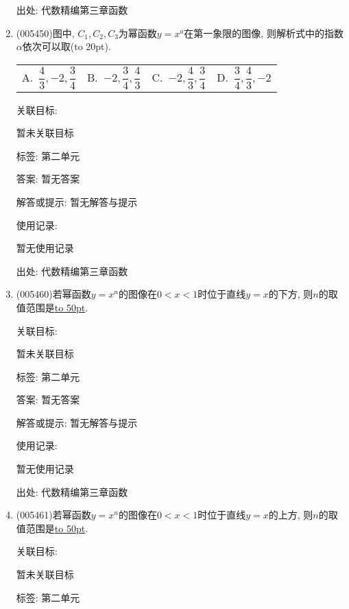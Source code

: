 \documentclass[10pt,a4paper]{article}
\newcommand{\blank}[1]{\underline{\hbox to #1pt{}}}
\newcommand{\bracket}[1]{(\hbox to #1pt{})}
\newcommand{\fourch}[4]{\par\begin{tabular}{p{.23\textwidth}p{.23\textwidth}p{.23\textwidth}p{.23\textwidth}}
A.~#1 &B.~#2& C.~#3& D.~#4
\end{tabular}}
\begin{document}
\begin{enumerate}[1.]
出处: 代数精编第三章函数
\item { (005450)}图中, $C_1,C_2,C_3$为幂函数$y=x^a$在第一象限的图像, 则解析式中的指数$\alpha$依次可以取\bracket{20}.
\begin{center}
\end{center}
\fourch{$\dfrac 43,-2,\dfrac 34$}{$-2,\dfrac 34,\dfrac 43$}{$-2,\dfrac 43,\dfrac 34$}{$\dfrac 34,\dfrac 43,-2$}


关联目标:

暂未关联目标



标签: 第二单元

答案: 暂无答案

解答或提示: 暂无解答与提示

使用记录:

暂无使用记录


出处: 代数精编第三章函数
\item { (005460)}若幂函数$y=x^n$的图像在$0<x<1$时位于直线$y=x$的下方, 则$n$的取值范围是\blank{50}.


关联目标:

暂未关联目标



标签: 第二单元

答案: 暂无答案

解答或提示: 暂无解答与提示

使用记录:

暂无使用记录


出处: 代数精编第三章函数
\item { (005461)}若幂函数$y=x^n$的图像在$0<x<1$时位于直线$y=x$的上方, 则$n$的取值范围是\blank{50}.


关联目标:

暂未关联目标



标签: 第二单元


\end{enumerate}
\end{document}
